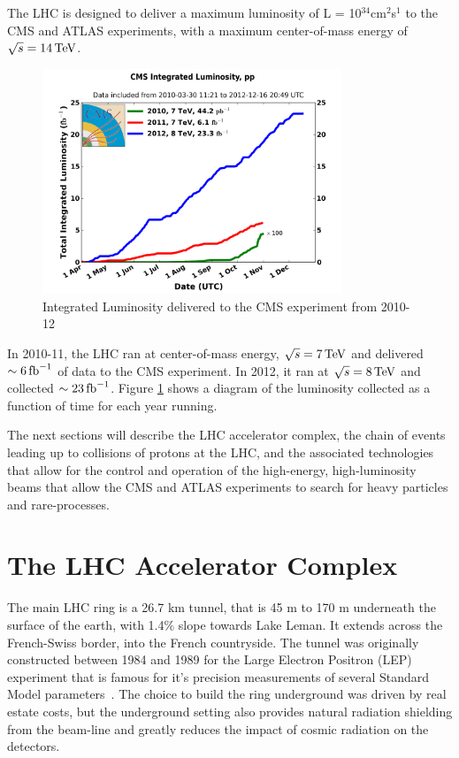 \noindent The LHC is designed to deliver a maximum luminosity of L =
10$^{34}$cm$^{2}$s$^{1}$ to the CMS and ATLAS experiments, with a
maximum center-of-mass energy of $\sqrt{s}=14\,\text{Te\hspace{-.08em}V}$.  


\begin{figure}[h]
   \centering
  \includegraphics[width=0.8\textwidth]{Figures/Experimental_Results/CMS__int_lumi_cumulative_pp_2.png}
  \caption{Integrated Luminosity delivered to the CMS experiment from
    2010-12 \cite{LHC:Lumi_delivered}} \label{fig:cms_integrated_lumi}
\end{figure}

\par In 2010-11, the LHC ran at center-of-mass energy,
$\sqrt{s}=7\,\text{Te\hspace{-.08em}V}$ and delivered $\sim6\mbox{\ensuremath{\,\text{fb}^\text{$-$1}}}$ of data to the CMS
experiment.  In 2012, it ran at $\sqrt{s}=8\,\text{Te\hspace{-.08em}V}$ and collected
$\sim23\mbox{\ensuremath{\,\text{fb}^\text{$-$1}}}$.  Figure \ref{fig:cms_integrated_lumi} shows a diagram of
the luminosity collected as a function of time for each year running.  

\par The next sections will describe the LHC accelerator complex, the
chain of events leading up to collisions of protons at the LHC, and
the associated technologies that allow for the control and operation
of the high-energy, high-luminosity beams that allow the CMS and ATLAS
experiments to search for heavy particles and rare-processes.  


\section{The LHC Accelerator Complex}
\label{lhc_injection_chain}

\par The main LHC ring is a 26.7 km tunnel, that is 45 m to 170 m
underneath the surface of the earth, with 1.4$\%$ slope towards Lake
Leman.  It extends across the French-Swiss border, into the French
countryside.  The tunnel was originally constructed between 1984 and 1989 for
the Large Electron Positron (LEP) experiment that is famous for it's
precision measurements of several Standard Model
parameters~\cite{lhc:machine_description}.  The choice to build the
ring underground was driven by real estate costs, but the underground
setting also provides natural radiation shielding from the beam-line
and greatly reduces the impact of cosmic radiation on the detectors.  

